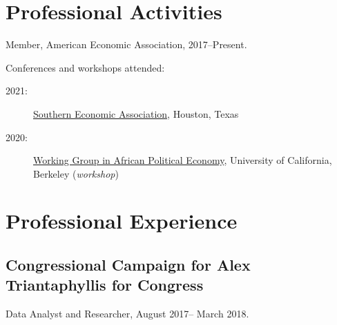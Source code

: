 \documentclass[10pt,letterpaper]{article}
\renewenvironment{itemize}{
  \begin{list}{}{
    \setlength{\leftmargin}{1.5em}
  }
}{
  \end{list}
}
\begin{document}
\section*{Professional Activities}
%
\begin{itemize}
%
\item Member, American Economic Association, 2017--Present.
%
%
%
\item Conferences and workshops attended:
%
\begin{description}
\item[2021:] \href{https://www.southerneconomic.org/session-details/?conferenceId=7&eventId=3353}%
{Southern Economic Association}, Houston, Texas
  \item[2020:] \href{https://cega.berkeley.edu/initiative/working-group-in-african-political-economy/}%
{Working Group in African Political Economy}, University of  California, Berkeley (\textit{workshop})
\end{description}
%
\end{itemize}
%
\section*{Professional Experience}
\subsection*{Congressional Campaign for Alex Triantaphyllis for Congress}
\begin{itemize}
\item Data Analyst and Researcher, August 2017-- March 2018.
\end{itemize}
\end{document}
